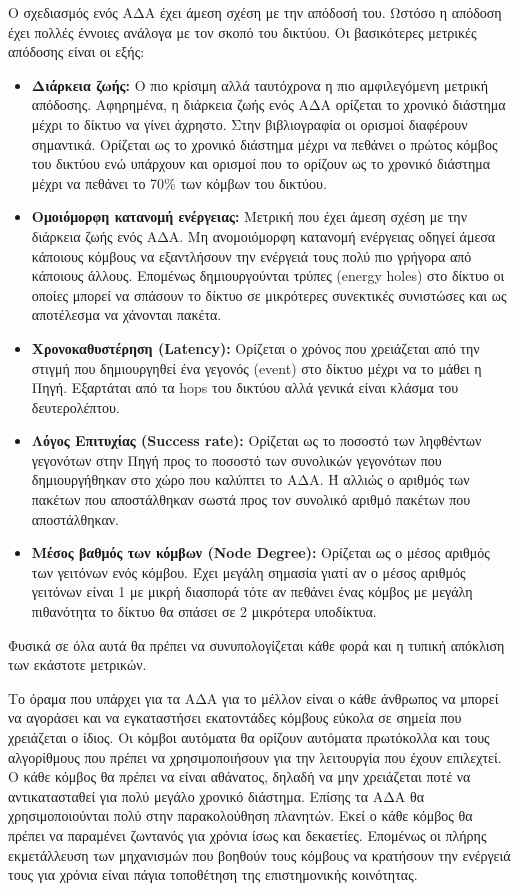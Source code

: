 Ο σχεδιασμός ενός ΑΔΑ έχει άμεση σχέση με την απόδοσή του. Ωστόσο η απόδοση έχει πολλές έννοιες ανάλογα με τον σκοπό του δικτύου. Οι βασικότερες μετρικές απόδοσης
είναι οι εξής:
\begin{itemize}
\item \textbf{Διάρκεια ζωής:} Ο πιο κρίσιμη αλλά ταυτόχρονα η πιο αμφιλεγόμενη μετρική απόδοσης. Αφηρημένα, η διάρκεια ζωής ενός ΑΔΑ ορίζεται το χρονικό διάστημα
μέχρι το δίκτυο να γίνει άχρηστο.
Στην βιβλιογραφία οι ορισμοί διαφέρουν σημαντικά.
Ορίζεται ως το χρονικό διάστημα μέχρι να πεθάνει ο πρώτος κόμβος του δικτύου ενώ υπάρχουν και ορισμοί που το ορίζουν ως το χρονικό διάστημα μέχρι να πεθάνει το 70\%
των κόμβων του δικτύου.
\item \textbf{Ομοιόμορφη κατανομή ενέργειας:} Μετρική που έχει άμεση σχέση με την διάρκεια ζωής ενός ΑΔΑ.
Μη ανομοιόμορφη κατανομή ενέργειας οδηγεί άμεσα κάποιους κόμβους να εξαντλήσουν την ενέργειά τους πολύ πιο γρήγορα από κάποιους άλλους.
Επομένως δημιουργούνται τρύπες (energy holes) στο δίκτυο οι οποίες μπορεί να σπάσουν το δίκτυο σε μικρότερες συνεκτικές συνιστώσες και ως αποτέλεσμα να χάνονται
πακέτα.
\item \textbf{Χρονοκαθυστέρηση (Latency):} Ορίζεται ο χρόνος που χρειάζεται από την στιγμή που δημιουργηθεί ένα γεγονός (event) στο δίκτυο μέχρι να το μάθει η Πηγή.
Εξαρτάται από τα hops του δικτύου αλλά γενικά είναι κλάσμα του δευτερολέπτου.
\item \textbf{Λόγος Επιτυχίας (Success rate):} Ορίζεται ως το ποσοστό των ληφθέντων γεγονότων στην Πηγή προς το ποσοστό των συνολικών γεγονότων που δημιουργήθηκαν στο
χώρο που καλύπτει
το ΑΔΑ.
Ή αλλιώς ο αριθμός των πακέτων που αποστάλθηκαν σωστά προς τον συνολικό αριθμό πακέτων που αποστάλθηκαν.
\item \textbf{Μέσος βαθμός των κόμβων (Node Degree):} Ορίζεται ως ο μέσος αριθμός των γειτόνων ενός κόμβου.
Έχει μεγάλη σημασία γιατί αν ο μέσος αριθμός γειτόνων είναι 1 με μικρή διασπορά τότε αν πεθάνει ένας κόμβος με μεγάλη πιθανότητα το δίκτυο θα σπάσει σε 2 μικρότερα
υποδίκτυα.
\end{itemize}
Φυσικά σε όλα αυτά θα πρέπει να συνυπολογίζεται κάθε φορά και η τυπική απόκλιση των εκάστοτε μετρικών.

Το όραμα που υπάρχει για τα ΑΔΑ για το μέλλον είναι ο κάθε άνθρωπος να μπορεί να αγοράσει και να εγκαταστήσει εκατοντάδες κόμβους εύκολα σε σημεία που χρειάζεται ο
ίδιος.
Οι κόμβοι αυτόματα θα ορίζουν αυτόματα πρωτόκολλα και τους αλγορίθμους που πρέπει να χρησιμοποιήσουν για την λειτουργία που έχουν επιλεχτεί.
Ο κάθε κόμβος θα πρέπει να είναι αθάνατος, δηλαδή να μην χρειάζεται ποτέ να αντικατασταθεί για πολύ μεγάλο χρονικό διάστημα.
Επίσης τα ΑΔΑ θα χρησιμοποιούνται πολύ στην παρακολούθηση πλανητών.
Εκεί ο κάθε κόμβος θα πρέπει να παραμένει ζωντανός για χρόνια ίσως και δεκαετίες.
Επομένως οι πλήρης εκμετάλλευση των μηχανισμών που βοηθούν τους κόμβους να κρατήσουν την ενέργειά τους για χρόνια είναι πάγια τοποθέτηση της επιστημονικής κοινότητας.

